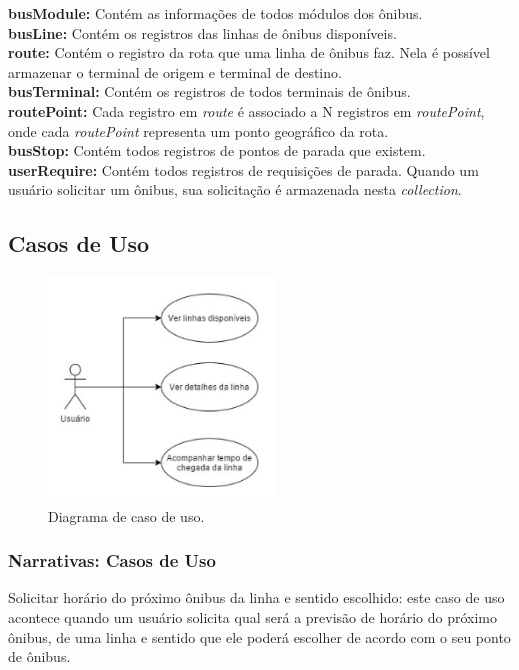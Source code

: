\documentclass[
	12pt,				%
	oneside,			%
	a4paper,			%
	brazil				%
]{abntex2}
\begin{document}
{\noindent \textbf{busModule:} Contém as informações de todos módulos dos ônibus.\\
\textbf{busLine:} Contém os registros das linhas de ônibus disponíveis.\\
\textbf{route:} Contém o registro da rota que uma linha de ônibus faz. Nela é possível armazenar o terminal de origem e terminal de destino.\\
\textbf{busTerminal:} Contém os registros de todos terminais de ônibus.\\
\textbf{routePoint:} Cada registro em \textit{route} é associado a N registros em \textit{routePoint}, onde cada \textit{routePoint} representa um ponto geográfico da rota.\\
\textbf{busStop:} Contém todos registros de pontos de parada que existem. \\
\textbf{userRequire:} Contém todos registros de requisições de parada. Quando um usuário solicitar um ônibus, sua solicitação é armazenada nesta \textit{collection}.\\

\newpage

\subsection{Casos de Uso}

\begin{figure}[!h]
\centering
\includegraphics[width=6cm, center]{images/use-case-diagram.png}
\caption{Diagrama de caso de uso.}
\label{Rotulo}
\end{figure}

\subsubsection{Narrativas: Casos de Uso}

Solicitar horário do próximo ônibus da linha e sentido escolhido: este caso de uso acontece quando um usuário solicita qual será a previsão de horário do próximo ônibus, de uma linha e sentido que ele poderá escolher de acordo com o seu ponto de ônibus.

}
\end{document}
